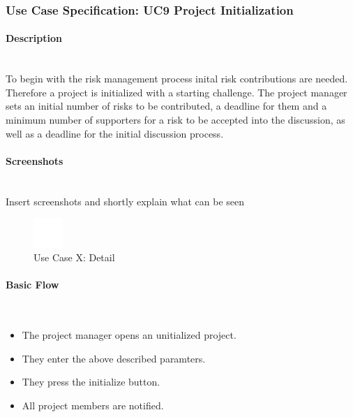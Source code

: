 
\newpage
\subsubsection{Use Case Specification: \ac{UC}9 Project Initialization}
\label{sec:domainBbj}

\paragraph*{Description}\mbox{}\\
To begin with the risk management process inital risk contributions are needed. Therefore a project is initialized with a starting challenge. The project manager sets an initial number of risks to be contributed, a deadline for them and a minimum number of supporters for a risk to be accepted into the discussion, as well as a deadline for the initial discussion process.

\paragraph*{Screenshots}\mbox{}\\
Insert screenshots and shortly explain what can be seen
\begin{figure}[h] 
	\centering
	\includegraphics[width=0.1\textwidth]{Content/Domain/placeholder.png}
	\caption{Use Case X: Detail}
	\label{fig:label9}
\end{figure}

\paragraph*{Basic Flow} \mbox{}\\

\begin{itemize}
	\vspace{-3mm}
	\setlength\itemsep{-1em}
	\item The project manager opens an unitialized project.
	\item They enter the above described paramters.
	\item They press the initialize button.
	\item All project members are notified.
\end{itemize} 

